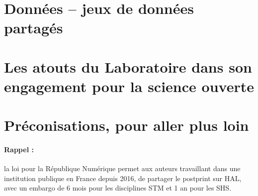 \documentclass[french, 11pt]{dibiso/biso}
\begin{document}
{\footnotesize\anrprojectsinfo}

\pagebreak

\section{Données – jeux de données partagés}







\pagebreak

\section{Les atouts du Laboratoire dans son engagement pour la science ouverte}








\section{Préconisations, pour aller plus loin}








\vfill

\paragraph{Rappel :} la loi pour la République Numérique permet aux auteurs travaillant dans une institution publique en France depuis 2016, de partager le postprint sur HAL, avec un embargo de 6 mois pour les disciplines STM et 1 an pour les SHS.


\makelastpagereport
 
\end{document}
